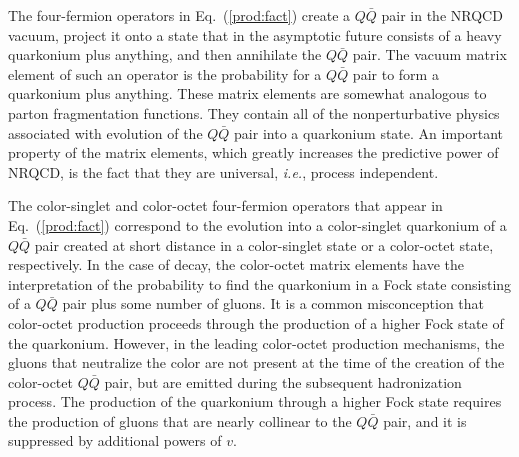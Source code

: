 The four-fermion operators in Eq.~(\ref{prod:fact}) create a $Q\bar Q
$ pair in the NRQCD vacuum, project it onto 
a state that in the asymptotic future
consists of a heavy quarkonium plus anything, and then annihilate the
$Q\bar Q$ pair. The vacuum matrix element of such an operator is the
probability for a $Q\bar Q$ pair to form a quarkonium plus anything.
These matrix elements are somewhat analogous to parton fragmentation
functions. They contain all of the nonperturbative physics associated
with evolution of the $Q\bar Q$ pair into a quarkonium state. An
important property of the matrix elements, which greatly increases the
predictive power of NRQCD, is the fact that they are universal, {\it
i.e.}, process independent.

The color-singlet and color-octet four-fermion operators 
that appear in Eq.~(\ref{prod:fact}) correspond to the evolution
into a color-singlet quarkonium of a $Q\bar Q$ pair 
created at short distance in a color-singlet state
or a color-octet state, respectively. In the case of decay, 
the color-octet matrix elements have the interpretation of the
probability to find the quarkonium in a Fock state consisting of a
$Q\bar Q$ pair plus some number of gluons. It is a common
misconception that color-octet production proceeds
through the production of a higher Fock state of the quarkonium.
However, in the leading color-octet production mechanisms,
the gluons that neutralize the color are not present 
at the time of the creation of the color-octet $Q \bar Q$ pair, 
but are emitted during the subsequent hadronization process. 
The production of the quarkonium through a higher Fock state
requires the production of gluons that are nearly
collinear to the $Q\bar Q$ pair, and it is suppressed by additional
powers of $v$.

